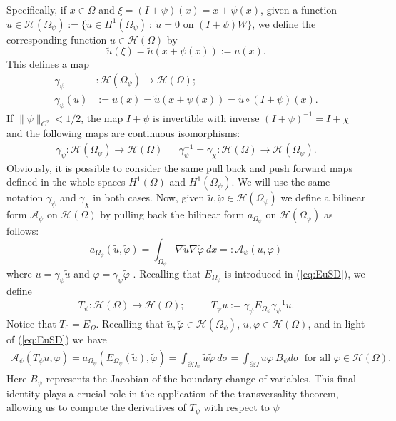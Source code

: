 \documentclass[a4paper,reqno,11pt,oneside]{amsart}
\theoremstyle{plain}
\theoremstyle{plain}
\theoremstyle{plain}
\theoremstyle{remark}
\begin{document}
Specifically, if $x\in \Omega $ and $\xi=(I+\psi)(x)=x+\psi(x)$, given a function $\tilde u\in \mathcal{H}(\Omega_\psi):=\{\tilde u\in H^1(\Omega_\psi)\ :\ \tilde u=0 \text{ on }(I+\psi)W\}$, we define the corresponding function $u\in \mathcal{H}(\Omega)$ by
 $$
\tilde u(\xi)=\tilde u(x+\psi (x)):=u(x).
$$
This defines a map 
\begin{align*}
\gamma_\psi&:\mathcal{H}(\Omega_{\psi})\rightarrow \mathcal{H}(\Omega);\\
\gamma_\psi(\tilde{u})&:=u(x)=\tilde{u}(x+\psi(x))=\tilde u\circ (I+\psi)(x).
\end{align*}
If $\|\psi\|_{C^2}<1/2$, the map $I+\psi$ is invertible with inverse $(I+\psi)^{-1}=I+\chi $ and the following maps are continuous isomorphisms:
\begin{eqnarray}
 \label{gamma-psi}
\gamma_{\psi} : \mathcal{H}(\Omega_{\psi})\rightarrow \mathcal{H}(\Omega)
& &
\gamma_{\psi}^{-1}=\gamma_{\chi}:\mathcal{H}(\Omega)\rightarrow \mathcal{H}(\Omega_{\psi}).
\end{eqnarray}
Obviously, it is possible to consider the same pull back and push forward maps defined in the whole spaces $H^1(\Omega)$  and $H^1(\Omega_\psi)$. We will use the same notation $\gamma_{\psi} $ and $\gamma_{\chi}$ in both cases. 
Now, given $\tilde u,\tilde \varphi \in \mathcal{H}(\Omega_\psi)$ we define a bilinear form $\mathcal{A}_\psi$  on $\mathcal{H}(\Omega)$ by pulling back the bilinear form  $a_{\Omega_\psi} $ on $\mathcal{H} (\Omega_\psi)$ as follows:
\begin{equation}
    \label{defA}
a_{\Omega_\psi}(\tilde u,\tilde \varphi)=\int_{\Omega_\psi} \nabla \tilde u \nabla \tilde \varphi \ dx  =:\mathcal{A}_\psi (u,\varphi) 
\end{equation}
where $u=\gamma_{\psi}\tilde u$ and $\varphi=\gamma_{\psi} \tilde \varphi$ .   
Recalling that $E_{\Omega_\psi}$ is introduced in (\ref{eq:EuSD}), we define
 \begin{eqnarray}\label{Tpsi}
T_\psi:\mathcal{H}(\Omega)\rightarrow\mathcal{H}(\Omega);&\quad& T_\psi{u}:=\gamma_\psi E_{\Omega_\psi} \gamma_\psi^{-1}{u}.
 \end{eqnarray}
Notice that $T_0=E_\Omega$. 
Recalling that  $\tilde{u},\tilde{\varphi}\in \mathcal{H}(\Omega_\psi)$,  ${u},{\varphi}\in \mathcal{H}(\Omega)$, and in light of  (\ref{eq:EuSD}) we have
  \begin{multline}
       \label{eq:SDfond}
     \mathcal{A}_\psi (T_\psi{u},\varphi) =a_{\Omega_\psi}(E_{\Omega_\psi}(\tilde u),\tilde \varphi)=\int_{\partial {\Omega_\psi}}  \tilde u \tilde \varphi\  d\sigma 
     =\int_{\partial \Omega} u\varphi\ B_\psi d\sigma 
 \    \text { for all }\varphi \in \mathcal{H}(\Omega). 
 \end{multline}
Here  $B_\psi$  represents the Jacobian  of the boundary change of variables. This final identity plays a crucial role in the application of the transversality theorem, allowing us to compute the derivatives of $T_\psi$ with respect to $\psi$
 
\end{document}
